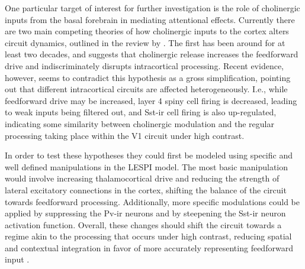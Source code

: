 One particular target of interest for further investigation is the
role of cholinergic inputs from the basal forebrain in mediating
attentional effects. Currently there are two main competing theories
of how cholinergic inputs to the cortex alters circuit dynamics,
outlined in the review by \cite{Thiele2013}. The first has been around
for at least two decades, and suggests that cholinergic release
increases the feedforward drive and indiscriminately disrupts
intracortical processing. Recent evidence, however, seems to
contradict this hypothesis as a gross simplification, pointing out that
different intracortical circuits are affected heterogeneously. I.e.,
while feedforward drive may be increased, layer 4
spiny cell firing is decreased, leading to weak inputs being filtered
out, and Sst-ir cell firing is also up-regulated, indicating some
similarity between cholinergic modulation and the regular processing
taking place within the V1 circuit under high contrast.

In order to test these hypotheses they could first be modeled using
specific and well defined manipulations in the LESPI
model. The most basic manipulation would involve increasing
thalamocortical drive and reducing the strength of lateral excitatory
connections in the cortex, shifting the balance of the circuit towards
feedforward processing. Additionally, more specific modulations could
be applied by suppressing the Pv-ir neurons and by steepening the Sst-ir neuron
activation function. Overall, these changes should shift the circuit
towards a regime akin to the processing that occurs under
high contrast, reducing spatial and contextual integration in favor of
more accurately representing feedforward input \citep{Roberts2005,
  Roberts2008a, Roberts2008b}.

